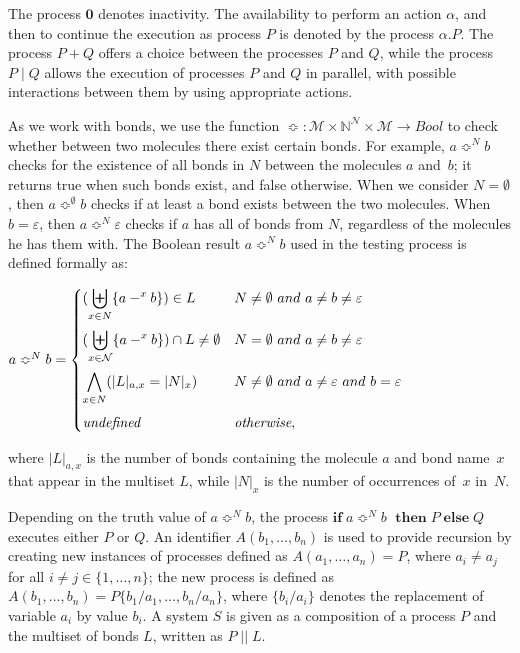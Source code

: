 \documentclass[runningheads]{llncs}
\newcommand{\N}{\mathbb{N}}
\newcommand{\mN}{\mathcal{N}}
\begin{document}
The process $\textbf{0}$ denotes inactivity. The availability to perform an 
action $\alpha$, and then to continue the execution as process $P$ is denoted 
by the process $\alpha.P$. The process $P+Q$ offers a choice 
between the processes $P$ and $Q$, while the process $P \mid Q$ allows the 
execution of processes $P$ and $Q$ in parallel, with possible interactions 
between them by using appropriate actions.

As we work with bonds, we use the function $\Bumpeq: \mathcal{M}\times 
\N^{\mN} \times \mathcal{M} \rightarrow Bool$ to check whether between two 
molecules there exist certain bonds. For example, $a\Bumpeq^N b$ checks for the 
existence of all bonds in $N$ between the molecules $a$ and~$b$; it 
returns true when such bonds exist, and false otherwise. When we consider 
$N=\emptyset$, then $a\Bumpeq^{\emptyset}b$ checks if at least a bond 
exists between the two molecules. When $b=\varepsilon$, then $a\Bumpeq^N 
{\varepsilon}$ checks if $a$ has all of bonds from $N$, regardless of 
the molecules he has them with. The Boolean result $a \Bumpeq^N b$ used 
in the testing process is defined formally as:
\smallskip

$a \Bumpeq^N b=\begin{cases}
\displaystyle(\biguplus_{x \in N} \{a-^x b\}) \in L & N \neq \emptyset~and ~a \neq b \neq \varepsilon\\[15pt]
\displaystyle(\biguplus_{x \in \mN} \{a-^x b\}) \cap L \neq \emptyset & N = \emptyset~and ~a \neq b \neq \varepsilon\\[15pt]
\displaystyle\bigwedge_{x \in N} (|L|_{a,x}=|N|_x) & N \neq \emptyset~and ~a \neq \varepsilon ~and~b = \varepsilon\\[15pt]
\emph{undefined} & \emph{otherwise},
\end{cases}$

\noindent where $|L|_{a,x}$ is the number of bonds containing the molecule 
$a$ and bond name~$x$ that appear in the multiset $L$, while $|N|_x$ is 
the number of occurrences of~$x$ in~$N$.

Depending on the truth value of $a \Bumpeq^N\!\! b $, the process 
$\textbf{if}\;a \Bumpeq^N\!\! b$ $\;\textbf{then}\;P\;\textbf{else}\;Q$ 
executes either $P$ or $Q$.  An identifier $ A(b_1,\ldots,b_n) $ is used 
to provide recursion by creating new instances of processes defined as 
$A(a_1,\ldots,a_n)=P$, where $a_i \neq a_j$ for all $i\neq j \in 
\{1,\ldots,n\}$; the new process is defined as $ A(b_1,\ldots,b_n) 
=P\{b_1/a_1,\ldots,b_n/a_n\}$, where $\{b_i/a_i\}$ denotes the replacement 
of variable $a_i$ by value $b_i$. A system $S$ is given as a 
composition of a process $P$ and the multiset of bonds $L$, written as $P \; || \; L$.
\end{document}
